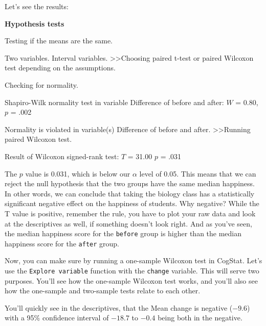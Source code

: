 \documentclass[
]{book}
\theoremstyle{definition}
\theoremstyle{definition}
\theoremstyle{definition}
\theoremstyle{definition}
\theoremstyle{remark}
\begin{document}
Let's see the results:

\begin{tcolorbox}[colback=white,
  colframe=lightgray,
  coltext=black,
  boxsep=4pt,
  boxrule=0.3pt,
  arc=0pt]
  {   \sffamily
      \color{CSblue}\textbf{Hypothesis tests}
      
      \color{CSgreen}Testing if the means are the same.
      
      Two variables. Interval variables. \textgreater\textgreater  Choosing paired t-test or paired Wilcoxon test depending on the assumptions.

      Checking for normality.

      \color{black}
      Shapiro-Wilk normality test in variable Difference of before and after: $W$ = 0.80, $p$ = .002

      \color{CSgreen}
      Normality is violated in variable(s) Difference of before and after. \textgreater\textgreater Running paired Wilcoxon test.

      \color{black}
      Result of Wilcoxon signed-rank test: $T$ = 31.00 $p$ = .031
      \normalfont
  }
\end{tcolorbox}

The \(p\) value is 0.031, which is below our \(\alpha\) level of 0.05. This means that we can reject the null hypothesis that the two groups have the same median happiness. In other words, we can conclude that taking the biology class has a statistically significant negative effect on the happiness of students. Why negative? While the T value is positive, remember the rule, you have to plot your raw data and look at the descriptives as well, if something doesn't look right. And as you've seen, the median happiness score for the \texttt{before} group is higher than the median happiness score for the \texttt{after} group.

Now, you can make sure by running a one-sample Wilcoxon test in CogStat. Let's use the \texttt{Explore\ variable} function with the \texttt{change} variable. This will serve two purposes. You'll see how the one-sample Wilcoxon test works, and you'll also see how the one-sample and two-sample tests relate to each other.

You'll quickly see in the descriptives, that the Mean change is negative (\(-9.6\)) with a 95\% confidence interval of \(-18.7\) to \(-0.4\) being both in the negative.
\end{document}
